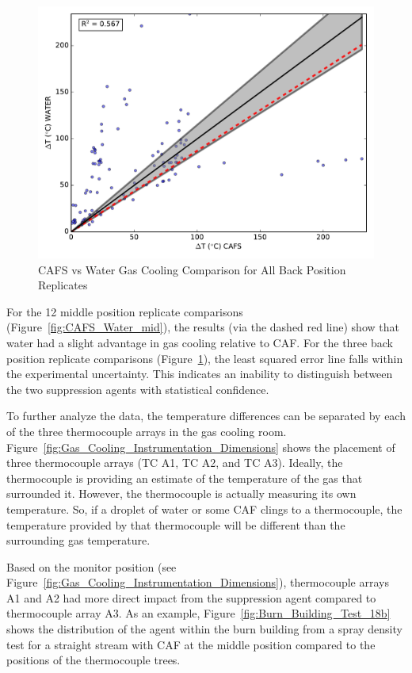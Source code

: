 \documentclass[12pt,oneside]{book}
\begin{document}
\begin{figure}[!ht]
	\includegraphics[width=.7\columnwidth]{../Figures/Gas_Cooling/Combined_fullback_scatter}
	\caption{CAFS vs Water Gas Cooling Comparison for All Back Position Replicates}
	\label{fig:CAFS_Water_full}
\end{figure}

For the 12 middle position replicate comparisons (Figure~\ref{fig:CAFS_Water_mid}), the results (via the dashed red line) show that water had a slight advantage in gas cooling relative to CAF. For the three back position replicate comparisons (Figure~\ref{fig:CAFS_Water_full}), the least squared error line falls within the experimental uncertainty. This indicates an inability to distinguish between the two suppression agents with statistical confidence. 

To further analyze the data, the temperature differences can be separated by each of the three thermocouple arrays in the gas cooling room. Figure~\ref{fig:Gas_Cooling_Instrumentation_Dimensions} shows the placement of three thermocouple arrays (TC A1, TC A2, and TC A3). Ideally, the thermocouple is providing an estimate of the temperature of the gas that surrounded it. However, the thermocouple is actually measuring its own temperature. So, if a droplet of water or some CAF clings to a thermocouple, the temperature provided by that thermocouple will be different than the surrounding gas temperature.

Based on the monitor position (see Figure~\ref{fig:Gas_Cooling_Instrumentation_Dimensions}), thermocouple arrays A1 and A2 had more direct impact from the suppression agent compared to thermocouple array A3. As an example, Figure~\ref{fig:Burn_Building_Test_18b} shows the distribution of the agent within the burn building from a spray density test for a straight stream with CAF at the middle position compared to the positions of the thermocouple trees.
\end{document}
